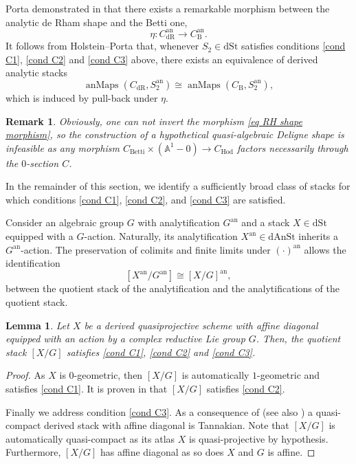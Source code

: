 \documentclass[11pt, a4paper]{amsart}
\numberwithin{equation}{section}
\newtheorem{lemma}[theorem]{Lemma}
\newtheorem{remark}[theorem]{Remark}
\theoremstyle{definition}
\theoremstyle{remark}
\DeclareMathOperator{\anMaps}{anMaps}
\DeclareMathOperator{\an}{an}
\DeclareMathOperator{\Betti}{Betti}
\DeclareMathOperator{\dR}{dR}
\DeclareMathOperator{\Hod}{Hod}
\newcommand{\B}{\mathrm{B}}
\renewcommand{\AA}{\mathbb{A}}
\renewcommand{\to}{\longrightarrow}
\begin{document}
Porta demonstrated in \cite{porta} that there exists a remarkable morphism between the analytic de Rham shape and the Betti one,
\begin{equation} \label{eq RH shape morphism}
\eta : C^{\an}_{\dR} \to C^{\an}_{\B}.
\end{equation}
It follows from Holstein--Porta \cite[Corollary 7.6]{holstein&porta} that, whenever $S_2 \in \mathrm{dSt}$ satisfies conditions \ref{cond C1}, \ref{cond C2} and \ref{cond C3} above, there exists an equivalence of derived analytic stacks
\[
\anMaps(C_{\dR}, S_2^{\an}) \cong \anMaps(C_{\B}, S_2^{\an}),
\]
which is induced by pull-back under $\eta$. 

\begin{remark} 
Obviously, one can not invert the morphism \eqref{eq RH shape morphism}, so the construction of a hypothetical quasi-algebraic Deligne shape is infeasible as any morphism $C_{\Betti} \times (\AA^1 - 0) \to C_{\Hod}$ factors necessarily through the $0$-section $C$.
\end{remark} 

In the remainder of this section, we identify a sufficiently broad class of stacks for which conditions \ref{cond C1}, \ref{cond C2}, and \ref{cond C3} are satisfied.

Consider an algebraic group $G$ with analytification $G^{\an}$ and a stack $X \in \mathrm{dSt}$ equipped with a $G$-action. Naturally, its analytification $X^{\an} \in \mathrm{dAnSt}$ inherits a $G^{\an}$-action. The preservation of colimits and finite limits under $(\cdot)^{\an}$ allows the identification 
\[
[X^{\an}/G^{\an}] \cong [X/G]^{\an},
\]
between the quotient stack of the analytification and the analytifications of the quotient stack. 


\begin{lemma} \label{lm conditions for X}
Let $X$ be a derived quasiprojective scheme with affine diagonal equipped with an action by a complex reductive Lie group $G$. Then, the quotient stack $[X/G]$ satisfies \ref{cond C1}, \ref{cond C2} and \ref{cond C3}.
\end{lemma}

\begin{proof}
As $X$ is $0$-geometric, then $[X/G]$ is automatically $1$-geometric and satisfies \ref{cond C1}. It is proven in \cite[Corollary 3.22]{benZvi&francis&nadler} that $[X/G]$ satisfies \ref{cond C2}. 

Finally we address condition \ref{cond C3}. As a consequence of \cite[Theorem 5.11]{lurie_tannakian} (see also \cite{lurie_VIII, bhatt&HalpernLeistner}) a quasi-compact derived stack with affine diagonal is Tannakian. Note that $[X/G]$ is automatically quasi-compact as its atlas $X$ is quasi-projective by hypothesis. Furthermore, $[X/G]$ has affine diagonal as so does $X$ and $G$ is affine.
\end{proof}
\end{document}
